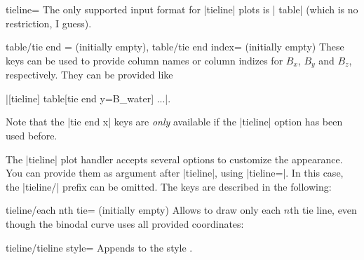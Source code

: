 \begin{plottype}{tieline=}
	The only supported input format for |tieline| plots is | table| (which is no restriction, I guess).
\begin{pgfplotsxykeylist}{%
	table/tie end \x= (initially empty),%
	table/tie end \x\space index= (initially empty)}
	These keys can be used to provide column names or column indizes for $B_x$, $B_y$ and $B_z$, respectively. They can be provided like 

	|[tieline] table[tie end y=B_water] ...|.

	Note that the |tie end x| keys are \emph{only} available if the |tieline| option has been used before.
\end{pgfplotsxykeylist}


	The |tieline| plot handler accepts several options to customize the appearance. You can provide them as argument after |tieline|, using |tieline=|. In this case, the |tieline/| prefix can be omitted. The keys are described in the following:
\begin{pgfplotskey}{tieline/each nth tie= (initially empty)}
	Allows to draw only each $n$th tie line, even though the binodal curve uses all provided coordinates:
\begin{codeexample}[]
\end{codeexample}
\end{pgfplotskey}

\begin{pgfplotskey}{tieline/tieline style=}
	Appends  to the style .


\end{pgfplotskey}
\end{plottype}
